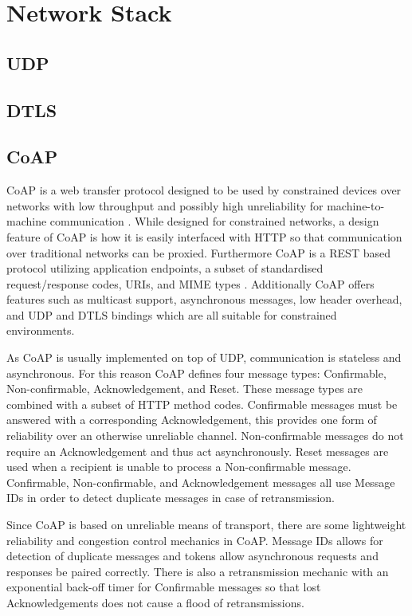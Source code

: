 \documentclass[0-thesis.tex]{subfiles}
\begin{document}
\section{Network Stack}
\subsection{UDP}

\subsection{DTLS}

\subsection{CoAP}
CoAP is a web transfer protocol designed to be used by constrained devices over networks with 
low throughput and possibly high unreliability for machine-to-machine communication 
\parencite{rfc7252}. While designed for constrained networks, a design feature of CoAP is 
how it is easily interfaced with HTTP so that communication over traditional networks can be 
proxied. Furthermore CoAP is a REST based protocol utilizing application endpoints, a subset 
of standardised request/response codes, URIs, and MIME types \parencite{rest}. Additionally 
CoAP offers features such as multicast support, asynchronous messages, low header overhead, 
and UDP and DTLS bindings which are all suitable for constrained environments.

As CoAP is usually implemented on top of UDP, communication is stateless and asynchronous. 
For this reason CoAP defines four message types: Confirmable, Non-confirmable, Acknowledgement,
and Reset. These message types are combined with a subset of HTTP method codes. Confirmable 
messages must be answered with a corresponding Acknowledgement, this provides one form of 
reliability over an otherwise unreliable channel. Non-confirmable messages do not require an 
Acknowledgement and thus act asynchronously. Reset messages are used when a recipient is 
unable to process a Non-confirmable message. Confirmable, Non-confirmable, and Acknowledgement
messages all use Message IDs in order to detect duplicate messages in case of retransmission.

Since CoAP is based on unreliable means of transport, there are some lightweight reliability 
and congestion control mechanics in CoAP. Message IDs allows for detection of duplicate 
messages and tokens allow asynchronous requests and responses be paired correctly. There is 
also a retransmission mechanic with an exponential back-off timer for Confirmable messages so 
that lost Acknowledgements does not cause a flood of retransmissions.
\end{document}
